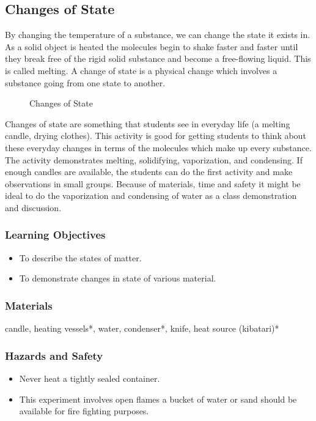 \subsection{Changes of State}
By changing the temperature of a substance, we can change the state it exists in. As a solid object is heated the molecules begin to shake faster and faster until they break free of the rigid solid substance and become a free-flowing liquid. This is called melting. A change of state is a physical change which involves a substance going from one state to another. \\

\begin{figure}[h!]
\begin{center}
\def\svgwidth{250pt}

\caption{Changes of State}
\end{center}
\end{figure}

Changes of state are something that students see in everyday life (a melting candle, drying clothes). This activity is good for getting students to think about these everyday changes in terms of the molecules which make up every substance. The activity demonstrates melting, solidifying, vaporization, and condensing. If enough candles are available, the students can do the first activity and make observations in small groups. Because of materials, time and safety it might be ideal to do the vaporization and condensing of water as a class demonstration and discussion.

\subsubsection*{Learning Objectives}
\begin{itemize}
\item{To describe the states of matter.}
\item{To demonstrate changes in state of various material.}
\end{itemize}

\subsubsection*{Materials}
candle, heating vessels*, water, condenser*, knife, heat source (kibatari)*

\subsubsection*{Hazards and Safety}
\begin{itemize}
\item{Never heat a tightly sealed container.}
\item{This experiment involves open flames a bucket of water or sand should be available for fire fighting purposes.}
\end{itemize}


